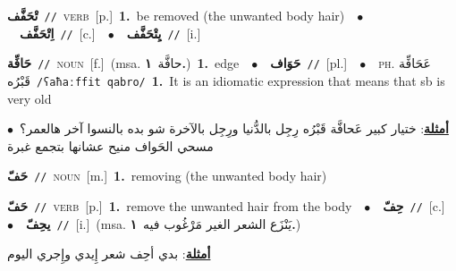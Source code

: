 \documentclass[10pt,a4paper,twoside]{article} %
\begin{document}
\begin{multicols}{2}
{\setlength\topsep{0pt}\textbf{\foreignlanguage{arabic}{تْحَفَّف}}\ {\color{gray}\texttt{//}\color{black}}\ \textsc{verb}\ [p.]\ \textbf{1.}~be removed (the unwanted body hair)\ \ $\bullet$\ \ \setlength\topsep{0pt}\textbf{\foreignlanguage{arabic}{اِتْحَفَّف}}\ {\color{gray}\texttt{//}\color{black}}\ [c.]\ \ $\bullet$\ \ \setlength\topsep{0pt}\textbf{\foreignlanguage{arabic}{يِتْحَفَّف}}\ {\color{gray}\texttt{//}\color{black}}\ [i.]\ } \vspace{2mm}

{\setlength\topsep{0pt}\textbf{\foreignlanguage{arabic}{حَافِّة}}\ {\color{gray}\texttt{//}\color{black}}\ \textsc{noun}\ [f.]\ \color{gray}(msa. \foreignlanguage{arabic}{حافَّة}~\foreignlanguage{arabic}{\textbf{١.}})\color{black}\ \textbf{1.}~edge\ \ $\bullet$\ \ \setlength\topsep{0pt}\textbf{\foreignlanguage{arabic}{حَوَاف}}\ {\color{gray}\texttt{//}\color{black}}\ [pl.]\ \ $\bullet$\ \ \textsc{ph.} \color{gray} \foreignlanguage{arabic}{عَحَافِّة قَبْرُه}\color{black}\ {\color{gray}\texttt{/{\sffamily ʕaħaːffit qabro}/}\color{black}}\ \textbf{1.}~It is an idiomatic expression that means that sb is very old\  \begin{flushright}\color{gray}\foreignlanguage{arabic}{\textbf{\underline{\foreignlanguage{arabic}{أمثلة}}}: ختيار كبير عَحافَّة قَبْرُه رِجِل بالدُّنيا ورِجِل بالآخرة شو بده بالنسوا آخر هالعمر؟\ $\bullet$\ \  مسحي الحَواف منيح عشانها بتجمع غبرة}\end{flushright}\color{black}} \vspace{2mm}

{\setlength\topsep{0pt}\textbf{\foreignlanguage{arabic}{حَفّ}}\ {\color{gray}\texttt{//}\color{black}}\ \textsc{noun}\ [m.]\ \textbf{1.}~removing (the unwanted body hair)\ } \vspace{2mm}

{\setlength\topsep{0pt}\textbf{\foreignlanguage{arabic}{حَفّ}}\ {\color{gray}\texttt{//}\color{black}}\ \textsc{verb}\ [p.]\ \textbf{1.}~remove the unwanted hair from the body\ \ $\bullet$\ \ \setlength\topsep{0pt}\textbf{\foreignlanguage{arabic}{حِفّ}}\ {\color{gray}\texttt{//}\color{black}}\ [c.]\ \ $\bullet$\ \ \setlength\topsep{0pt}\textbf{\foreignlanguage{arabic}{يحِفّ}}\ {\color{gray}\texttt{//}\color{black}}\ [i.]\ \color{gray}(msa. \foreignlanguage{arabic}{يَنْزَع الشعر الغير مَرْغُوب فيه}~\foreignlanguage{arabic}{\textbf{١.}})\color{black}\  \begin{flushright}\color{gray}\foreignlanguage{arabic}{\textbf{\underline{\foreignlanguage{arabic}{أمثلة}}}: بدي أحِف شعر إِيدي وإِجري اليوم}\end{flushright}\color{black}} \vspace{2mm}


\end{multicols}
\end{document}
